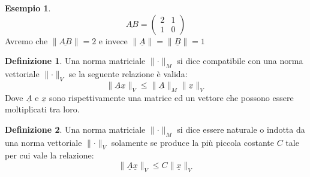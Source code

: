 \documentclass[12pt, a4paper]{book}
\theoremstyle{definition}
\newtheorem{exmp}{Esempio}[section]
\newtheorem{defn}{Definizione}[section]
\newcommand{\VarMtrx}[1]{\ensuremath{\underline{#1}}}
\begin{document}
\begin{flushleft}
\begin{exmp}
\[ 
	\VarMtrx{AB} = \begin{pmatrix} 2 & 1 \\ 1 & 0  \end{pmatrix} 
\]
Avremo che $\lVert \VarMtrx{AB}\rVert = 2$ e invece $\lVert \VarMtrx{A}\rVert  = \lVert\VarMtrx{B}\rVert = 1$
\end{exmp}

\begin{defn}
Una norma matriciale $\lVert\cdot\rVert_{M}$ si dice compatibile con una norma vettoriale  $\lVert\cdot\rVert_{V}$ se la seguente relazione è valida: 
\[  \lVert\VarMtrx{A}\VarMtrx{x}\rVert_{V} \leq \lVert\VarMtrx{A}\rVert_{M}\lVert\VarMtrx{x}\rVert_{V} \]
Dove $\VarMtrx{A}$ e $\VarMtrx{x}$ sono rispettivamente una matrice ed un vettore che possono essere moltiplicati tra loro. 
\end{defn}

\begin{defn}
Una norma matriciale $\lVert\cdot\rVert_{M}$ si dice essere naturale o indotta da una norma vettoriale  $\lVert\cdot\rVert_{V}$
solamente se produce la più piccola costante $C$ tale per cui vale la relazione:
\[ 
	\lVert\VarMtrx{A}\VarMtrx{x}\rVert_{V} \leq C\lVert\VarMtrx{x}\rVert_{V} 
\]
\end{defn}
\end{flushleft}
\end{document}
